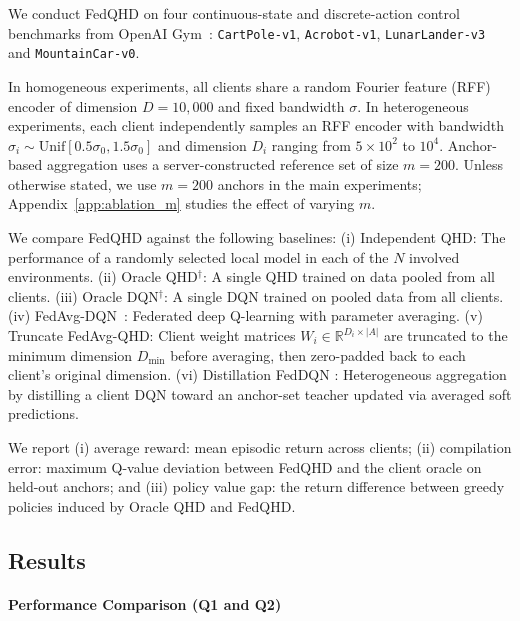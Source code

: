\documentclass[sigconf,anonymous]{aamas}
\theoremstyle{plain}
\theoremstyle{definition}
\theoremstyle{remark}
\begin{document}
We conduct FedQHD on four continuous-state and discrete-action control benchmarks from OpenAI Gym~\citep{brockman2016openai}: \texttt{CartPole-v1}, \texttt{Acrobot-v1}, \texttt{LunarLander-v3} and \texttt{MountainCar-v0}.

In homogeneous experiments, all clients share a random Fourier feature (RFF) encoder of dimension $D=10{,}000$ and fixed bandwidth $\sigma$.
In heterogeneous experiments, each client independently samples an RFF encoder with bandwidth $\sigma_i \sim \mathrm{Unif}[0.5\sigma_0,1.5\sigma_0]$ and dimension $D_i$ ranging from $5\times10^2$ to $10^4$. Anchor-based aggregation uses a server-constructed reference set of size $m=200$. Unless otherwise stated, we use \(m=200\) anchors in the main experiments; Appendix~\ref{app:ablation_m} studies the effect of varying \(m\).




We compare FedQHD against the following baselines:
{(i) Independent QHD: The performance of a randomly selected local model in each of the $N$ involved environments.} {(ii) Oracle QHD$^\dagger$: A single QHD trained on data pooled from all clients.} { (iii) Oracle DQN$^\dagger$: A single DQN trained on pooled data from all clients.} {(iv) FedAvg-DQN~\citep{jin2022federated}: Federated deep Q-learning with parameter averaging.} { (v) Truncate FedAvg-QHD: Client weight matrices $W_i \in \mathbb{R}^{D_i \times |A|}$ are truncated to the minimum dimension $D_{\min}$ before averaging, then zero-padded back to each client's original dimension.}
{(vi) Distillation FedDQN \citep{jiang2025fedhpd}: Heterogeneous aggregation by distilling a client DQN toward an anchor-set teacher updated via averaged soft predictions.}

We report (i) average reward: mean episodic return across
clients; (ii) compilation error: maximum Q-value deviation
between FedQHD and the client oracle on held-out anchors; and
(iii) policy value gap: the return difference between greedy
policies induced by Oracle QHD and FedQHD.


\subsection{Results}
\label{sec:results}

\paragraph{Performance Comparison (Q1 and Q2)}
\label{subsec:performance_homo}
\end{document}
